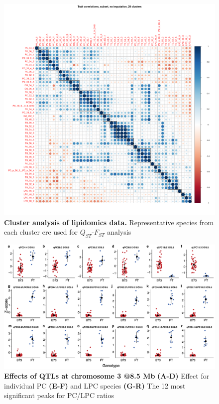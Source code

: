 \documentclass[9pt,twocolumn,twoside,lineno]{biorxiv}
\begin{document}
\clearpage

\begin{figure}[t]
\begin{center}
\includegraphics[width=0.8\paperwidth]{Sup_Figures/Sup_Fig_1.png}
\caption{\textbf{Cluster analysis of lipidomics data.} Representative species from each cluster ere used for $Q_{ST}$-$F_{ST}$ analysis}
\label{figure:Sup:lipid_clusters}
\end{center}
\end{figure}  

\clearpage

\begin{figure}[t]
\begin{center}
\includegraphics[width=0.8\paperwidth]{Sup_Figures/Sup_Fig_2.png}
\caption{\textbf{Effects of QTLs at chromosome 3 @8.5 Mb} \textbf{(A-D)} Effect for individual PC \textbf{(E-F)} and LPC species
\textbf{(G-R)} The 12 most significant peaks for PC/LPC ratios} 
\label{figure:Sup:QTL_effect_sp}
\end{center}
\end{figure}  
\end{document}
